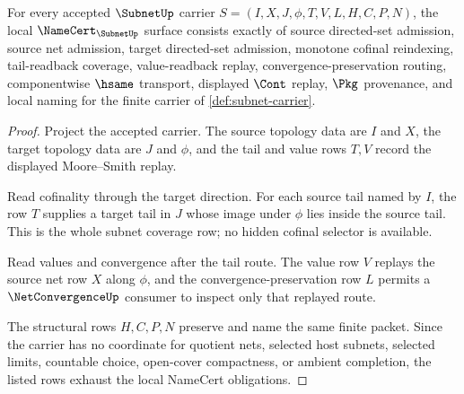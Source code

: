 \begin{theorem}
\label{thm:subnet-namecert-obligations}
For every accepted $\SubnetUp$ carrier $S=(I,X,J,\phi,T,V,L,H,C,P,N)$, the local $\NameCert_{\SubnetUp}$ surface consists exactly of source directed-set admission, source net admission, target directed-set admission, monotone cofinal reindexing, tail-readback coverage, value-readback replay, convergence-preservation routing, componentwise $\hsame$ transport, displayed $\Cont$ replay, $\Pkg$ provenance, and local naming for the finite carrier of \autoref{def:subnet-carrier}.
\end{theorem}
\begin{proof}
Project the accepted carrier. The source topology data are $I$ and $X$, the target topology data are $J$ and $\phi$, and the tail and value rows $T,V$ record the displayed Moore--Smith replay.

Read cofinality through the target direction. For each source tail named by $I$, the row $T$ supplies a target tail in $J$ whose image under $\phi$ lies inside the source tail. This is the whole subnet coverage row; no hidden cofinal selector is available.

Read values and convergence after the tail route. The value row $V$ replays the source net row $X$ along $\phi$, and the convergence-preservation row $L$ permits a $\NetConvergenceUp$ consumer to inspect only that replayed route.

The structural rows $H,C,P,N$ preserve and name the same finite packet. Since the carrier has no coordinate for quotient nets, selected host subnets, selected limits, countable choice, open-cover compactness, or ambient completion, the listed rows exhaust the local NameCert obligations.
\end{proof}

